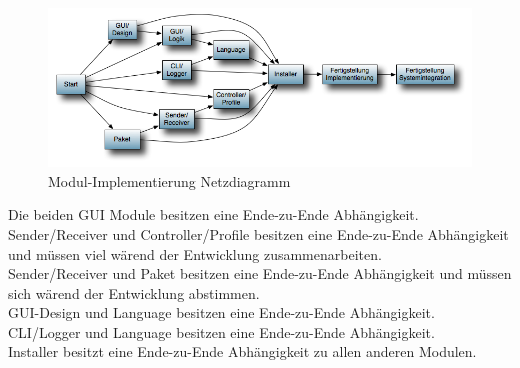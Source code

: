 \begin{figure}[h]
\centering
\includegraphics[width=16.5cm]{images/Modul-Netz.png}
\caption{Modul-Implementierung Netzdiagramm}\label{fig:modulnetz}
\end{figure}

Die beiden GUI Module besitzen eine Ende-zu-Ende Abhängigkeit.\\
Sender/Receiver und Controller/Profile besitzen eine Ende-zu-Ende Abhängigkeit und müssen viel wärend der Entwicklung zusammenarbeiten.\\
Sender/Receiver und Paket besitzen eine Ende-zu-Ende Abhängigkeit und müssen sich wärend der Entwicklung abstimmen.\\
GUI-Design und Language besitzen eine Ende-zu-Ende Abhängigkeit.\\
CLI/Logger und Language besitzen eine Ende-zu-Ende Abhängigkeit.\\
Installer besitzt eine Ende-zu-Ende Abhängigkeit zu allen anderen Modulen.\\
